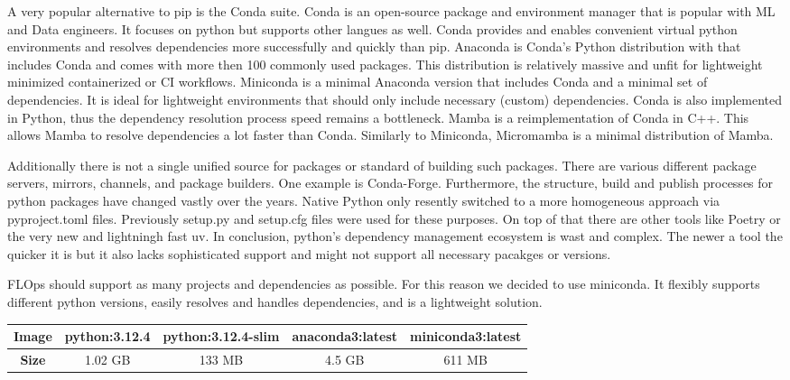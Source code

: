 A very popular alternative to pip is the Conda suite.
Conda is an open-source package and environment manager that is popular with ML and Data engineers.
It focuses on python but supports other langues as well.
Conda provides and enables convenient virtual python environments and resolves dependencies more successfully and quickly than pip.
Anaconda is Conda's Python distribution with that includes Conda and comes with more then 100 commonly used packages.
This distribution is relatively massive and unfit for lightweight minimized containerized or CI workflows.
Miniconda is a minimal Anaconda version that includes Conda and a minimal set of dependencies.
It is ideal for lightweight environments that should only include necessary (custom) dependencies.
Conda is also implemented in Python, thus the dependency resolution process speed remains a bottleneck.
Mamba is a reimplementation of Conda in C++.
This allows Mamba to resolve dependencies a lot faster than Conda.
Similarly to Miniconda, Micromamba is a minimal distribution of Mamba.

Additionally there is not a single unified source for packages or standard of building such packages.
There are various different package servers, mirrors, channels, and package builders.
One example is Conda-Forge.
Furthermore, the structure, build and publish processes for python packages have changed vastly over the years.
Native Python only resently switched to a more homogeneous approach via pyproject.toml files.
Previously setup.py and setup.cfg files were used for these purposes.
On top of that there are other tools like Poetry or the very new and lightningh fast uv.
In conclusion, python's dependency management ecosystem is wast and complex.
The newer a tool the quicker it is but it also lacks sophisticated support and might not support all necessary pacakges or versions.

FLOps should support as many projects and dependencies as possible.
For this reason we decided to use miniconda.
It flexibly supports different python versions, easily resolves and handles dependencies, and is a lightweight solution.

\begin{changemargin}{0cm}{0cm}
    \centering
    \begin{tabular}{|c||c|c|c|c|}
        \hline
            \textbf{Image} & python:3.12.4 & python:3.12.4-slim & anaconda3:latest & miniconda3:latest \\
        \hline
            \textbf{Size} & 1.02 GB & 133 MB & 4.5 GB & 611 MB
        \\
        \hline
    \end{tabular}
    \label{table:conda_python_comparison}
\end{changemargin}

